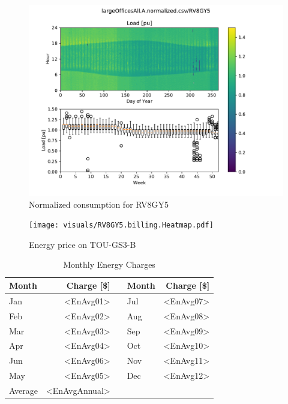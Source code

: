 \documentclass[11pt]{article}
\begin{document}
\pagestyle{energy}

\begin{figure}[!h]
\centering
\includegraphics[width=\columnwidth, page=1, trim=0in 0.45in 0in 0.45in, clip]{visuals/RV8GY5.heatmap.pdf}
\caption{Normalized consumption for RV8GY5}
\label{fig:heatmap}
\end{figure}

\begin{figure}[!h]
\centering
\texttt{[image: visuals/RV8GY5.billing.Heatmap.pdf]}
\caption{Energy price on TOU-GS3-B}
\label{fig:toumap}
\end{figure}

\lipsum[1][1-7]

\begin{table}[th!]
  \centering
  \caption{Monthly Energy Charges}
  \vspace{1.5ex}
  \label{tab:energy}
  \begin{tabular}{p{0.75in}rp{0.2in}p{0.75in}r}
    Month & Charge [\$] & & Month & Charge [\$] \\
    \midrule
    Jan & <EnAvg01> & & Jul & <EnAvg07> \\
    Feb & <EnAvg02> & & Aug & <EnAvg08> \\
    Mar & <EnAvg03> & & Sep & <EnAvg09> \\
    Apr & <EnAvg04> & & Oct & <EnAvg10> \\
    Jun & <EnAvg06> & & Nov & <EnAvg11> \\
    May & <EnAvg05> & & Dec & <EnAvg12> \\
    \midrule
    Average & <EnAvgAnnual> & & &
  \end{tabular}
\end{table}
\end{document}
